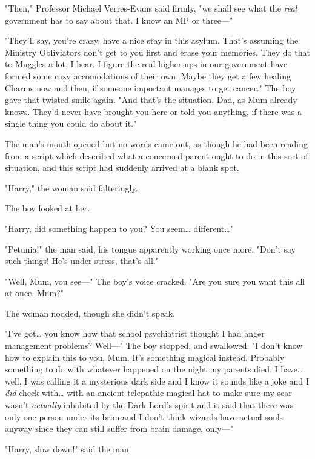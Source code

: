 "Then," Professor Michael Verres-Evans said firmly, "we shall see what the 
\emph{real} government has to say about that. I know an MP or three---"

"They'll say, you're crazy, have a nice stay in this asylum. That's assuming 
the Ministry Obliviators don't get to you first and erase your memories. They 
do that to Muggles a lot, I hear. I figure the real higher-ups in our 
government have formed some cozy accomodations of their own. Maybe they get a 
few healing Charms now and then, if someone important manages to get cancer." 
The boy gave that twisted smile again. "And that's the situation, Dad, as Mum 
already knows. They'd never have brought you here or told you anything, if 
there was a single thing you could do about it."

The man's mouth opened but no words came out, as though he had been reading 
from a script which described what a concerned parent ought to do in this sort 
of situation, and this script had suddenly arrived at a blank spot.

"Harry," the woman said falteringly.

The boy looked at her.

"Harry, did something happen to you? You seem{\ldots} different{\ldots}"

"Petunia!" the man said, his tongue apparently working once more. "Don't say 
such things! He's under stress, that's all."

"Well, Mum, you see---" The boy's voice cracked. "Are you sure you want this 
all at once, Mum?"

The woman nodded, though she didn't speak.

"I've got{\ldots} you know how that school psychiatrist thought I had anger 
management problems? Well---" The boy stopped, and swallowed. "I don't know how 
to explain this to you, Mum. It's something magical instead. Probably something 
to do with whatever happened on the night my parents died. I have{\ldots} well, 
I was calling it a mysterious dark side and I know it sounds like a joke and I 
\emph{did} check with{\ldots} with an ancient telepathic magical hat to make 
sure my scar wasn't \emph{actually} inhabited by the Dark Lord's spirit and it 
said that there was only one person under its brim and I don't think wizards 
have actual souls anyway since they can still suffer from brain damage, only---"

"Harry, slow down!" said the man.

